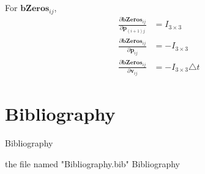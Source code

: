 \documentclass[12pt]{article}   %
\begin{document}
\begin{appendices}
For $\textbf{bZeros}_{ij}$,
\begin{align}
\frac{\partial \textbf{bZeros}_{ij}}{\partial \textbf{p}_{(i+1)j}} &= I_{3\times 3} \\
\frac{\partial \textbf{bZeros}_{ij}}{\partial \textbf{p}_{ij}} &= - I_{3\times 3} \\
\frac{\partial \textbf{bZeros}_{ij}}{\partial \textbf{v}_{ij}} &= - I_{3\times 3} \triangle t  
\end{align}


	
\end{appendices}

\newpage 
\section{Bibliography}
\label{Bibliography}


Bibliography

the file named "Bibliography.bib" Bibliography
\end{document}
